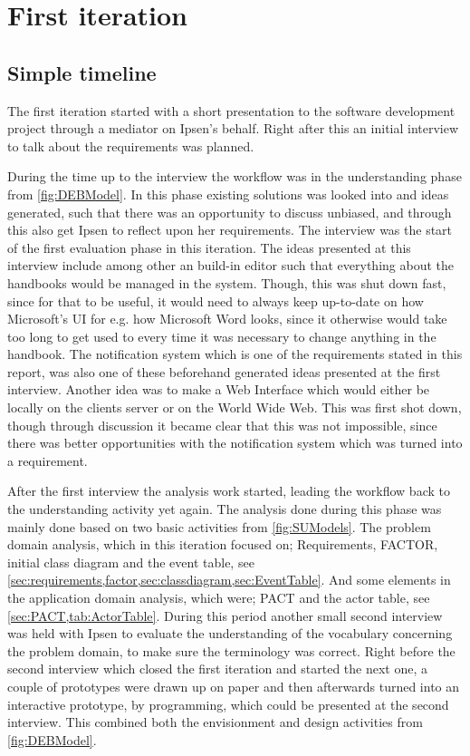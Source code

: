\section{First iteration}\label{sec:Iteration1}
\subsection{Simple timeline}\label{sec:1-simpleTime}
The first iteration started with a short presentation to the software development project through a mediator on Ipsen's behalf.
Right after this an initial interview to talk about the requirements was planned.

During the time up to the interview the workflow was in the understanding phase from \cref{fig:DEBModel}.
In this phase existing solutions was looked into and ideas generated, such that there was an opportunity to discuss unbiased, and through this also get Ipsen to reflect upon her requirements.
The interview was the start of the first evaluation phase in this iteration.
The ideas presented at this interview include among other an build-in editor such that everything about the handbooks would be managed in the system.
Though, this was shut down fast, since for that to be useful, it would need to always keep up-to-date on how Microsoft's UI for e.g. how Microsoft Word looks, since it otherwise would take too long to get used to every time it was necessary to change anything in the handbook.
The notification system which is one of the requirements stated in this report, was also one of these beforehand generated ideas presented at the first interview. 
Another idea was to make a Web Interface which would either be locally on the clients server or on the World Wide Web.
This was first shot down, though through discussion it became clear that this was not impossible, since there was better opportunities with the notification system which was turned into a requirement.

After the first interview the analysis work started, leading the workflow back to the understanding activity yet again.
The analysis done during this phase was mainly done based on two basic activities from \cref{fig:SUModels}.
The problem domain analysis, which in this iteration focused on; Requirements, FACTOR, initial class diagram and the event table, see \cref{sec:requirements,factor,sec:classdiagram,sec:EventTable}.
And some elements in the application domain analysis, which were; PACT and the actor table, see \cref{sec:PACT,tab:ActorTable}.
During this period another small second interview was held with Ipsen to evaluate the understanding of the vocabulary concerning the problem domain, to make sure the terminology was correct.
Right before the second interview which closed the first iteration and started the next one, a couple of prototypes were drawn up on paper and then afterwards turned into an interactive prototype, by programming, which could be presented at the second interview.
This combined both the envisionment and design activities from \cref{fig:DEBModel}.

